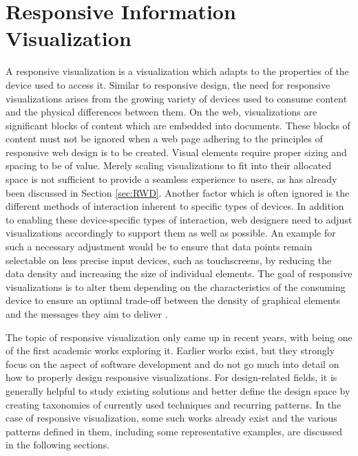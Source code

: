 \chapter{Responsive Information Visualization}

A responsive visualization is a visualization which adapts to the properties of the device used to access it. Similar to responsive design, the need for responsive visualizations arises from the growing variety of devices used to consume content and the physical differences between them. On the web, visualizations are significant blocks of content which are embedded into documents. These blocks of content must not be ignored when a web page adhering to the principles of responsive web design is to be created. Visual elements require proper sizing and spacing to be of value. Merely scaling visualizations to fit into their allocated space is not sufficient to provide a seamless experience to users, as has already been discussed in Section \ref{sec:RWD}. Another factor which is often ignored is the different methods of interaction inherent to specific types of devices. In addition to enabling these device-specific types of interaction, web designers need to adjust visualizations accordingly to support them as well as possible. An example for such a necessary adjustment would be to ensure that data points remain selectable on less precise input devices, such as touchscreens, by reducing the data density and increasing the size of individual elements. The goal of responsive visualizations is to alter them depending on the characteristics of the consuming device to ensure an optimal trade-off between the density of graphical elements and the messages they aim to deliver \parencite{DesignPatternsTradeOffsRespVis}. 

The topic of responsive visualization only came up in recent years, with \cite{RespVis} being one of the first academic works exploring it. Earlier works \parencite{BuildingRespDataVisForTheWeb,LearningRespDataVis} exist, but they strongly focus on the aspect of software development and do not go much into detail on how to properly design responsive visualizations.  For design-related fields, it is generally helpful to study existing solutions and better define the design space by creating taxonomies of currently used techniques and recurring patterns. In the case of responsive visualization, some such works already exist \parencite{TechniquesForFlexibleRespVisDesign,DesignPatternsTradeOffsRespVis,RespVisSurvey} and the various patterns defined in them, including some representative examples, are discussed in the following sections.


